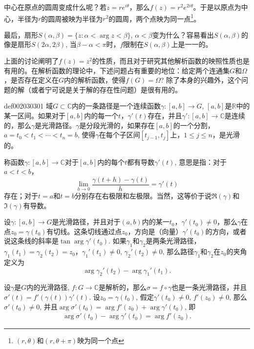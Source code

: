 中心在原点的圆周变成什么呢？若$z = re^{i\theta}$，那么$f(z) = r^2e^{2i\theta}$。于是以原点为中心，半径为$r$的圆周被映为半径为$r^2$的圆周，两个点映为同一点\footnote{$(r, \theta)$和$(r, \theta+\pi)$映为同一个点}。

最后，扇形$S(\alpha, \beta)=\{z:\alpha < \arg{z} < \beta\}$, $\alpha < \beta$变为什么？容易看出$S(\alpha, \beta)$的像是扇形$S(2\alpha, 2\beta)$, 当$\beta-\alpha < \pi$时，$f$限制在$S(\alpha, \beta)$上是一一的。

上面的讨论阐明了$f(z)=z^2$的性质，而且对于研究其他解析函数的映照性质也是有用的。在解析函数的理论中，下述问题占有重要的地位：给定两个连通集$G$和$\Omega$，是否存在定义在$G$内的解析函数，使得$f(G) = \Omega$? 除了本身的兴趣外，这个问题的解（或者宁可说是关于解的存在性问题）是很有用的。

\begin{definition}{}{def002030301}
域$G \subset \mathbb{C}$内的一条路径是一个连续函数$\gamma: [a,b] \to G$, $[a, b]$是$\mathbb{R}$中的某一区间。如果对于$[a, b]$内的每一个$t$，$\gamma'(t)$存在，并且$\gamma':[a, b] \to \mathbb{C} $是连续的，那么$\gamma$是光滑路径。$\gamma$是分段光滑的，如果存在$[a, b]$的一个分割，$a = t_0 < t_1 < \cdots < t_n=b$, 使得$\gamma$在每个子区间$[t_{j-1}, t_j]$上，$1 \le j \le n$，是光滑的。
\end{definition}

称函数$\gamma:[a, b] \to \mathbb{C}$对于$[a, b]$内的每个$t$都有导数$\gamma'(t)$, 意思是指：对于$a < t < b$，
\[
\lim_{h \to 0}{\frac{\gamma{(t+h)} - \gamma{(t)}}{h}} = \gamma'(t)
\]
存在；对于$t=a$和$t=b$分别存在右极限和左极限。当然，这等价于说$\Re{(\gamma)}$和$\Im{(\gamma)}$有导数。

设$\gamma:[a,b] \to G$是光滑路径，并且对于$(a, b)$内的某一$t_0$，$\gamma'(t_0) \neq 0$，那么$\gamma$在点$z_0 = \gamma(t_0)$有切线。这条切线通过点$z_0$，方向是（向量）$\gamma'(t_0)$的方向，或者说这条线的斜率是$\tan{\arg{\gamma'(t_0)}}$. 如果$\gamma_1$和$\gamma_2$是两条光滑路径，$\gamma_1(t_1) = \gamma_2(t_2)=z_0$，$\gamma_1'(t_1) \neq 0$, $\gamma_2'(t_2) \neq 0$, 那么路径$\gamma_1$和$\gamma_2$在$z_0$的夹角定义为
\[
\arg{\gamma_2'(t_2)} - \arg{\gamma_1'(t_1)}.
\]

设$\gamma$是$G$内的光滑路径, $f:G \to \mathbb{C}$是解析的，那么$\sigma = f \circ \gamma$也是一条光滑路径，并且$\sigma'(t) = f'(\gamma(t))\gamma'(t)$. 设$z_0 = \gamma(t_0)$, 假定$\gamma'(t_0) \neq 0$, $f'(z_0) \neq 0$, 那么$\sigma'(t_0) \neq 0$, 并且$\arg{\sigma'(t_0)} = \arg{f'(z_0)} + \arg{\gamma'(t_0)}$, 即
\begin{gather}\label{equ002030302}
\arg{\sigma'(t_0)} - \arg{\gamma'(t_0)} = \arg{f'(z_0)}.
\end{gather}

